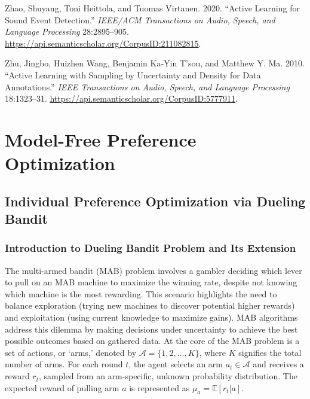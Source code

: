 \documentclass[
  letterpaper,
  numbers=noenddot,
  DIV=11]{scrreprt}
\newlength{\cslhangindent}
\newenvironment{CSLReferences}[2] %
 {\begin{list}{}{%
  \setlength{\itemindent}{0pt}
  \setlength{\leftmargin}{0pt}
  \setlength{\parsep}{0pt}
  \ifodd #1
   \setlength{\leftmargin}{\cslhangindent}
   \setlength{\itemindent}{-1\cslhangindent}
  \fi
  \setlength{\itemsep}{#2\baselineskip}}}
 {\end{list}}
\let\oldchapter\chapter
\def\chapter{%
  \setcounter{sidenote}{1}%
  \oldchapter
}
\theoremstyle{definition}
\theoremstyle{plain}
\theoremstyle{plain}
\theoremstyle{remark}
\begin{document}
\begin{CSLReferences}{1}{0}
Zhao, Shuyang, Toni Heittola, and Tuomas Virtanen. 2020. {``Active
Learning for Sound Event Detection.''} \emph{IEEE/ACM Transactions on
Audio, Speech, and Language Processing} 28:2895--905.
\url{https://api.semanticscholar.org/CorpusID:211082815}.

Zhu, Jingbo, Huizhen Wang, Benjamin Ka-Yin T'sou, and Matthew Y. Ma.
2010. {``Active Learning with Sampling by Uncertainty and Density for
Data Annotations.''} \emph{IEEE Transactions on Audio, Speech, and
Language Processing} 18:1323--31.
\url{https://api.semanticscholar.org/CorpusID:5777911}.

\end{CSLReferences}


\chapter{Model-Free Preference Optimization}\label{sec-model-free}

\section{Individual Preference Optimization via Dueling
Bandit}\label{individual-preference-optimization-via-dueling-bandit}

\subsection{Introduction to Dueling Bandit Problem and Its
Extension}\label{introduction-to-dueling-bandit-problem-and-its-extension}

The multi-armed bandit (MAB) problem involves a gambler deciding which
lever to pull on an MAB machine to maximize the winning rate, despite
not knowing which machine is the most rewarding. This scenario
highlights the need to balance exploration (trying new machines to
discover potential higher rewards) and exploitation (using current
knowledge to maximize gains). MAB algorithms address this dilemma by
making decisions under uncertainty to achieve the best possible outcomes
based on gathered data. At the core of the MAB problem is a set of
actions, or `arms,' denoted by \(\mathcal{A} = \{1, 2, \ldots, K\}\),
where \(K\) signifies the total number of arms. For each round \(t\),
the agent selects an arm \(a_t \in \mathcal{A}\) and receives a reward
\(r_t\), sampled from an arm-specific, unknown probability distribution.
The expected reward of pulling arm \(a\) is represented as
\(\mu_a = \mathbb{E}[r_t | a]\).
\end{document}
